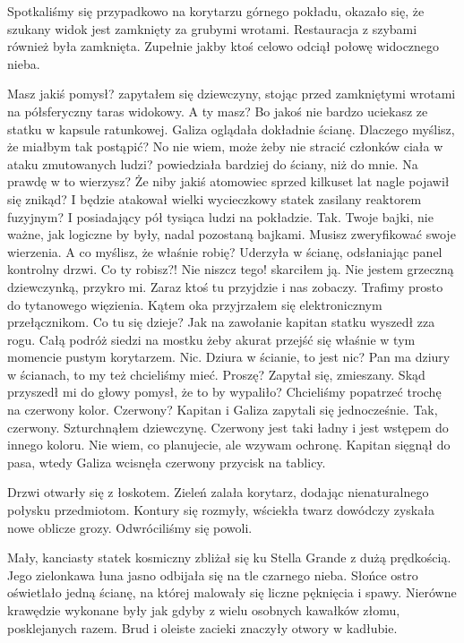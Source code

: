 Spotkaliśmy się przypadkowo na korytarzu górnego pokładu, okazało się, że szukany widok jest zamknięty za grubymi wrotami.
Restauracja z szybami również była zamknięta.
Zupełnie jakby ktoś celowo odciął połowę widocznego nieba.

\begin{dialogue}
	\ds{} Masz jakiś pomysł? \dm{} zapytałem się dziewczyny, stojąc przed zamkniętymi wrotami na półsferyczny taras widokowy.
	\ds{} A ty masz? Bo jakoś nie bardzo uciekasz ze statku w kapsule ratunkowej. \dm{} Galiza oglądała dokładnie ścianę.
	\ds{} Dlaczego myślisz, że miałbym tak postąpić?
	\ds{} No nie wiem, może żeby nie stracić członków ciała w ataku zmutowanych ludzi? \dm{} powiedziała bardziej do ściany, niż do mnie.
	\ds{} Na prawdę w to wierzysz? Że niby jakiś atomowiec sprzed kilkuset lat nagle pojawił się znikąd? I będzie atakował wielki wycieczkowy statek zasilany reaktorem fuzyjnym?
	\ds{} I posiadający pół tysiąca ludzi na pokładzie. Tak.
	\ds{} Twoje bajki, nie ważne, jak logiczne by były, nadal pozostaną bajkami. Musisz zweryfikować swoje wierzenia.
	\ds{} A co myślisz, że właśnie robię? \dm{} Uderzyła w ścianę, odsłaniając panel kontrolny drzwi.
	\ds{} Co ty robisz?! Nie niszcz tego! \dm{} skarciłem ją.
	\ds{} Nie jestem grzeczną dziewczynką, przykro mi.
	\ds{} Zaraz ktoś tu przyjdzie i nas zobaczy. Trafimy prosto do tytanowego więzienia. \dm{} Kątem oka przyjrzałem się elektronicznym przełącznikom.
	\ds{} Co tu się dzieje? \dm{} Jak na zawołanie kapitan statku wyszedł zza rogu. Całą podróż siedzi na mostku żeby akurat przejść się właśnie w tym momencie pustym korytarzem.
	\ds{} Nic.
	\ds{} Dziura w ścianie, to jest nic?
	\ds{} Pan ma dziury w ścianach, to my też chcieliśmy mieć. 
	\ds{} Proszę? \dm{} Zapytał się, zmieszany. Skąd przyszedł mi do głowy pomysł, że to by wypaliło?
	\ds{} Chcieliśmy popatrzeć trochę na czerwony kolor.
	\ds{} Czerwony? \dm{} Kapitan i Galiza zapytali się jednocześnie.
	\ds{} Tak, czerwony. \dm{} Szturchnąłem dziewczynę. Czerwony jest taki ładny i jest wstępem do innego koloru.
	\ds{} Nie wiem, co planujecie, ale wzywam ochronę. \dm{} Kapitan sięgnął do pasa, wtedy Galiza wcisnęła czerwony przycisk na tablicy.
\end{dialogue}

Drzwi otwarły się z łoskotem.
Zieleń zalała korytarz, dodając nienaturalnego połysku przedmiotom.
Kontury się rozmyły, wściekła twarz dowódczy zyskała nowe oblicze grozy.
Odwróciliśmy się powoli.

Mały, kanciasty statek kosmiczny zbliżał się ku Stella Grande z dużą prędkością.
Jego zielonkawa łuna jasno odbijała się na tle czarnego nieba.
Słońce ostro oświetlało jedną ścianę, na której malowały się liczne pęknięcia i spawy.
Nierówne krawędzie wykonane były jak gdyby z wielu osobnych kawałków złomu, posklejanych razem.
Brud i oleiste zacieki znaczyły otwory w kadłubie.

